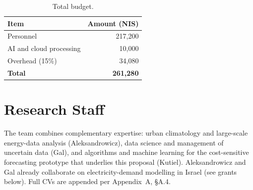 \documentclass[12pt,a4paper]{article}
\begin{document}
\begin{table}[H]
\centering
\caption{Personnel plan (12 months).}
\label{tab:personnel}
\end{table}

\begin{table}[H]
\centering
\caption{Total budget.}
\label{tab:budget}
\begin{tabular}{@{}lr@{}}
\toprule
\textbf{Item} & \textbf{Amount (NIS)} \\
\midrule
Personnel                       & 217{,}200 \\
AI and cloud processing         & 10{,}000 \\
Overhead (15\%)                 & 34{,}080 \\
\midrule
\textbf{Total}                  & \textbf{261{,}280} \\
\bottomrule
\end{tabular}
\end{table}

\section{Research Staff}
\label{sec:staff}

The team combines complementary expertise: urban climatology and large-scale energy-data
analysis (Aleksandrowicz), data science and management of uncertain data (Gal), and
algorithms and machine learning for the cost-sensitive forecasting prototype that underlies
this proposal (Kutiel). Aleksandrowicz and Gal already collaborate on electricity-demand
modelling in Israel (see grants below). Full CVs are appended per Appendix~A, \S A.4.
\end{document}
